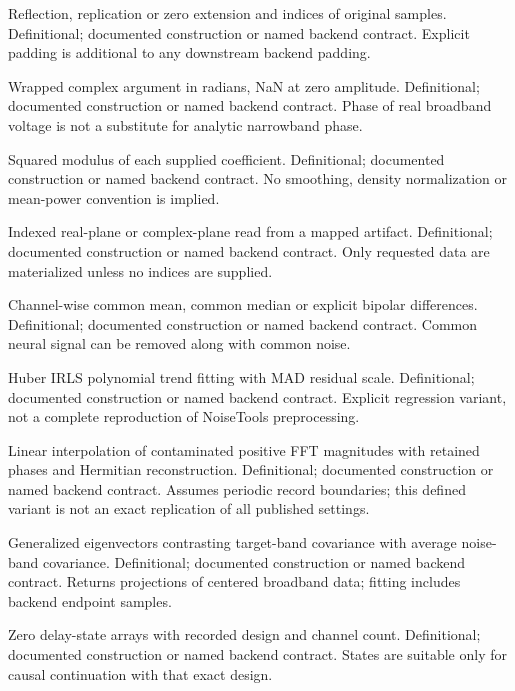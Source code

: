 {Reflection, replication or zero extension and indices of original samples.}
{Definitional; documented construction or named backend contract.}
{Explicit padding is additional to any downstream backend padding.}

{Wrapped complex argument in radians, NaN at zero amplitude.}
{Definitional; documented construction or named backend contract.}
{Phase of real broadband voltage is not a substitute for analytic narrowband phase.}

{Squared modulus of each supplied coefficient.}
{Definitional; documented construction or named backend contract.}
{No smoothing, density normalization or mean-power convention is implied.}

{Indexed real-plane or complex-plane read from a mapped artifact.}
{Definitional; documented construction or named backend contract.}
{Only requested data are materialized unless no indices are supplied.}

{Channel-wise common mean, common median or explicit bipolar differences.}
{Definitional; documented construction or named backend contract.}
{Common neural signal can be removed along with common noise.}

{Huber IRLS polynomial trend fitting with MAD residual scale.}
{Definitional; documented construction or named backend contract.}
{Explicit regression variant, not a complete reproduction of NoiseTools preprocessing.}

{Linear interpolation of contaminated positive FFT magnitudes with retained phases and Hermitian reconstruction.}
{Definitional; documented construction or named backend contract.}
{Assumes periodic record boundaries; this defined variant is not an exact replication of all published settings.}

{Generalized eigenvectors contrasting target-band covariance with average noise-band covariance.}
{Definitional; documented construction or named backend contract.}
{Returns projections of centered broadband data; fitting includes backend endpoint samples.}

{Zero delay-state arrays with recorded design and channel count.}
{Definitional; documented construction or named backend contract.}
{States are suitable only for causal continuation with that exact design.}

